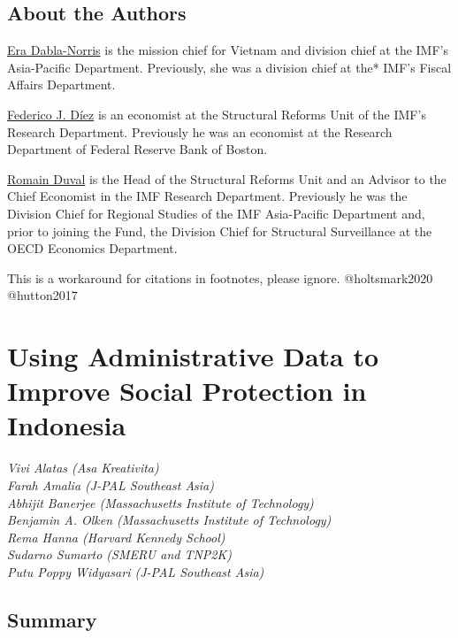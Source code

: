 \documentclass[
]{book}
\begin{document}
\hypertarget{about-the-authors-8}{%
\section*{About the Authors}\label{about-the-authors-8}}

\href{https://www.imf.org/external/np/cv/AuthorCV.aspx?AuthID=299}{Era Dabla-Norris} is the mission chief for Vietnam and division chief at the IMF's Asia-Pacific Department. Previously, she was a division chief at the* IMF's Fiscal Affairs Department.

\href{https://www.imf.org/external/np/cv/AuthorCV.aspx?AuthID=311}{Federico J. Díez} is an economist at the Structural Reforms Unit of the IMF's Research Department. Previously he was an economist at the Research Department of Federal Reserve Bank of Boston.

\href{https://www.imf.org/external/np/cv/AuthorCV.aspx?AuthID=291}{Romain Duval} is the Head of the Structural Reforms Unit and an Advisor to the Chief Economist in the IMF Research Department. Previously he was the Division Chief for Regional Studies of the IMF Asia-Pacific Department and, prior to joining the Fund, the Division Chief for Structural Surveillance at the OECD Economics Department.

\begin{invisible}
This is a workaround for citations in footnotes, please ignore.
@holtsmark2020 @hutton2017
\end{invisible}

\hypertarget{indonesia}{%
\chapter{Using Administrative Data to Improve Social Protection in Indonesia}\label{indonesia}}

\emph{Vivi Alatas (Asa Kreativita)}\\
\emph{Farah Amalia (J-PAL Southeast Asia)}\\
\emph{Abhijit Banerjee (Massachusetts Institute of Technology)}\\
\emph{Benjamin A. Olken (Massachusetts Institute of Technology)}\\
\emph{Rema Hanna (Harvard Kennedy School)}\\
\emph{Sudarno Sumarto (SMERU and TNP2K)}\\
\emph{Putu Poppy Widyasari (J-PAL Southeast Asia)}

\hypertarget{summary-10}{%
\section{Summary}\label{summary-10}}
\end{document}
